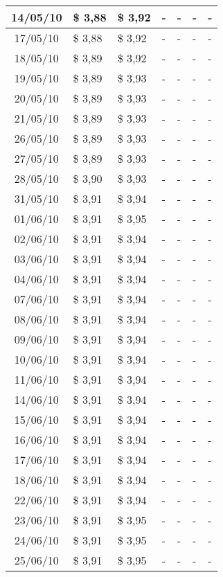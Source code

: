 \begin{center}
\begin{longtable}{|c|p{1.5cm}|p{1.5cm}|p{1.5cm}|p{1.5cm}|p{1.5cm}|p{1.5cm}|}
14/05/10 & \$ 3,88 & \$ 3,92 & - & - & - & - \\ \hline
17/05/10 & \$ 3,88 & \$ 3,92 & - & - & - & - \\ \hline
18/05/10 & \$ 3,89 & \$ 3,92 & - & - & - & - \\ \hline
19/05/10 & \$ 3,89 & \$ 3,93 & - & - & - & - \\ \hline
20/05/10 & \$ 3,89 & \$ 3,93 & - & - & - & - \\ \hline
21/05/10 & \$ 3,89 & \$ 3,93 & - & - & - & - \\ \hline
26/05/10 & \$ 3,89 & \$ 3,93 & - & - & - & - \\ \hline
27/05/10 & \$ 3,89 & \$ 3,93 & - & - & - & - \\ \hline
28/05/10 & \$ 3,90 & \$ 3,93 & - & - & - & - \\ \hline
31/05/10 & \$ 3,91 & \$ 3,94 & - & - & - & - \\ \hline
01/06/10 & \$ 3,91 & \$ 3,95 & - & - & - & - \\ \hline
02/06/10 & \$ 3,91 & \$ 3,94 & - & - & - & - \\ \hline
03/06/10 & \$ 3,91 & \$ 3,94 & - & - & - & - \\ \hline
04/06/10 & \$ 3,91 & \$ 3,94 & - & - & - & - \\ \hline
07/06/10 & \$ 3,91 & \$ 3,94 & - & - & - & - \\ \hline
08/06/10 & \$ 3,91 & \$ 3,94 & - & - & - & - \\ \hline
09/06/10 & \$ 3,91 & \$ 3,94 & - & - & - & - \\ \hline
10/06/10 & \$ 3,91 & \$ 3,94 & - & - & - & - \\ \hline
11/06/10 & \$ 3,91 & \$ 3,94 & - & - & - & - \\ \hline
14/06/10 & \$ 3,91 & \$ 3,94 & - & - & - & - \\ \hline
15/06/10 & \$ 3,91 & \$ 3,94 & - & - & - & - \\ \hline
16/06/10 & \$ 3,91 & \$ 3,94 & - & - & - & - \\ \hline
17/06/10 & \$ 3,91 & \$ 3,94 & - & - & - & - \\ \hline
18/06/10 & \$ 3,91 & \$ 3,94 & - & - & - & - \\ \hline
22/06/10 & \$ 3,91 & \$ 3,94 & - & - & - & - \\ \hline
23/06/10 & \$ 3,91 & \$ 3,95 & - & - & - & - \\ \hline
24/06/10 & \$ 3,91 & \$ 3,95 & - & - & - & - \\ \hline
25/06/10 & \$ 3,91 & \$ 3,95 & - & - & - & - \\ \hline

\end{longtable}
\end{center}
